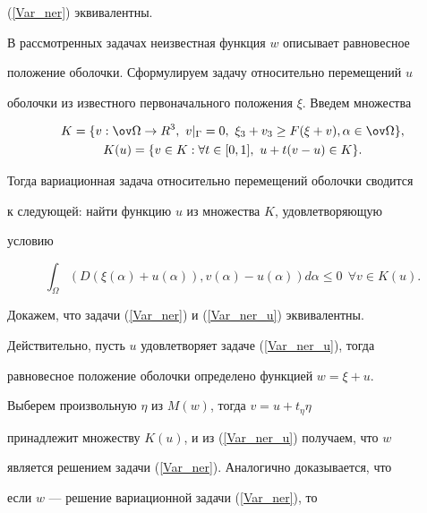 (\ref{Var_ner}) эквивалентны.





В рассмотренных задачах неизвестная функция $w$ описывает равновесное


положение оболочки. Сформулируем задачу относительно перемещений $u$


оболочки из известного первоначального положения $\xi$. Введем множества


\begin{gather} 


K=\{v : \ov\Omega \to R^3,


\ {v} |_\Gamma =0 ,\ \xi_3+v_3 \geq F(\xi+v), \alpha \in \ov\Omega \},


\label{K} \\


%


K(u)=\{{v \in K: \forall t \in [0,1],\ u+t ( v - u ) \in K} \} .


\label{Ku}


\end{gather}


Тогда вариационная задача относительно перемещений оболочки сводится 


к следующей: найти функцию $u$ из множества $K$, удовлетворяющую 


условию


\begin{equation} 


\int_\Omega ({D (\xi(\alpha )+u(\alpha)), v(\alpha )- u(\alpha )})d \alpha 


\leq 0 \ \ \forall v \in K(u) . 


\label{Var_ner_u}


\end{equation}


Докажем, что задачи (\ref{Var_ner}) и (\ref{Var_ner_u}) эквивалентны.


Действительно, пусть $u$ удовлетворяет задаче (\ref{Var_ner_u}), тогда


равновесное положение оболочки определено функцией $w=\xi+u$.


Выберем произвольную $\eta$ из $M(w)$, тогда $v=u+t_\eta\eta$


принадлежит множеству $K(u)$, и из (\ref{Var_ner_u}) получаем, что $w$


является решением задачи (\ref{Var_ner}). Аналогично доказывается, что


если $w$ --- решение вариационной задачи (\ref{Var_ner}), то 


